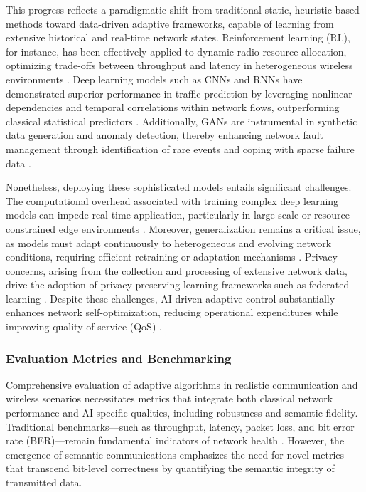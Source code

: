 This progress reflects a paradigmatic shift from traditional static, heuristic-based methods toward data-driven adaptive frameworks, capable of learning from extensive historical and real-time network states. Reinforcement learning (RL), for instance, has been effectively applied to dynamic radio resource allocation, optimizing trade-offs between throughput and latency in heterogeneous wireless environments \cite{ref1,ref7}. Deep learning models such as CNNs and RNNs have demonstrated superior performance in traffic prediction by leveraging nonlinear dependencies and temporal correlations within network flows, outperforming classical statistical predictors \cite{ref2,ref3,ref5}. Additionally, GANs are instrumental in synthetic data generation and anomaly detection, thereby enhancing network fault management through identification of rare events and coping with sparse failure data \cite{ref6,ref10}.

Nonetheless, deploying these sophisticated models entails significant challenges. The computational overhead associated with training complex deep learning models can impede real-time application, particularly in large-scale or resource-constrained edge environments \cite{ref4,ref5}. Moreover, generalization remains a critical issue, as models must adapt continuously to heterogeneous and evolving network conditions, requiring efficient retraining or adaptation mechanisms \cite{ref7}. Privacy concerns, arising from the collection and processing of extensive network data, drive the adoption of privacy-preserving learning frameworks such as federated learning \cite{ref10,ref11}. Despite these challenges, AI-driven adaptive control substantially enhances network self-optimization, reducing operational expenditures while improving quality of service (QoS) \cite{ref14,ref50}.

\subsubsection{Evaluation Metrics and Benchmarking}

Comprehensive evaluation of adaptive algorithms in realistic communication and wireless scenarios necessitates metrics that integrate both classical network performance and AI-specific qualities, including robustness and semantic fidelity. Traditional benchmarks---such as throughput, latency, packet loss, and bit error rate (BER)---remain fundamental indicators of network health \cite{ref3,ref5}. However, the emergence of semantic communications emphasizes the need for novel metrics that transcend bit-level correctness by quantifying the semantic integrity of transmitted data.

